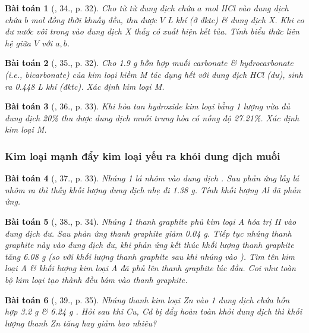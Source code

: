\documentclass{article}
\newtheorem{baitoan}{Bài toán}
\begin{document}
\begin{baitoan}[\cite{An_350_BT_Hoa_Hoc_9}, 34., p. 32]
	Cho từ từ dung dịch chứa $a$ \emph{mol HCl} vào dung dịch chứa $b$ \emph{mol } đồng thời khuấy đều, thu được $V$ \emph{L} khí (ở đktc) \& dung dịch X. Khi co dư nước vôi trong vào dung dịch X thấy có xuất hiện kết tủa. Tính biểu thức liên hệ giữa $V$ với $a,b$.
\end{baitoan}

\begin{baitoan}[\cite{An_350_BT_Hoa_Hoc_9}, 35., p. 32]
	Cho \emph{1.9 g} hỗn hợp muối carbonate \& hydrocarbonate (i.e., bicarbonate) của kim loại kiềm M tác dụng hết với dung dịch \emph{HCl} (dư), sinh ra \emph{0.448 L} khí (đktc). Xác định kim loại M.
\end{baitoan}

\begin{baitoan}[\cite{An_350_BT_Hoa_Hoc_9}, 36., p. 33]
	Khi hòa tan hydroxide kim loại \emph{} bằng 1 lượng vừa đủ dung dịch \emph{ 20\%} thu được dung dịch muối trung hòa có nồng độ \emph{27.21\%}. Xác định kim loại M.
\end{baitoan}

\subsubsection{Kim loại mạnh đẩy kim loại yếu ra khỏi dung dịch muối}

\begin{baitoan}[\cite{An_350_BT_Hoa_Hoc_9}, 37., p. 33]
	Nhúng 1 lá nhôm vào dung dịch \emph{}. Sau phản ứng lấy lá nhôm ra thì thấy khối lượng dung dịch nhẹ đi \emph{1.38 g}. Tính khối lượng \emph{Al} đã phản ứng.
\end{baitoan}

\begin{baitoan}[\cite{An_350_BT_Hoa_Hoc_9}, 38., p. 34]
	Nhúng 1 thanh graphite phủ kim loại A hóa trị II vào dung dịch \emph{} dư. Sau phản ứng thanh graphite giảm \emph{0.04 g}. Tiếp tục nhúng thanh graphite này vào dung dịch \emph{} dư, khi phản ứng kết thúc khối lượng thanh graphite tăng \emph{6.08 g} (so với khối lượng thanh graphite sau khi nhúng vào \emph{}). Tìm tên kim loại A \& khối lượng kim loại A đã phủ lên thanh graphite lúc đầu. Coi như toàn bộ kim loại tạo thành đều bám vào thanh graphite.
\end{baitoan}

\begin{baitoan}[\cite{An_350_BT_Hoa_Hoc_9}, 39., p. 35]
	Nhúng thanh kim loại \emph{Zn} vào 1 dung dịch chứa hỗn hợp \emph{3.2 g } \& \emph{6.24 g }. Hỏi sau khi \emph{Cu, Cd} bị đẩy hoàn toàn khỏi dung dịch thì khối lượng thanh \emph{Zn} tăng hay giảm bao nhiêu?	
\end{baitoan}
\end{document}
